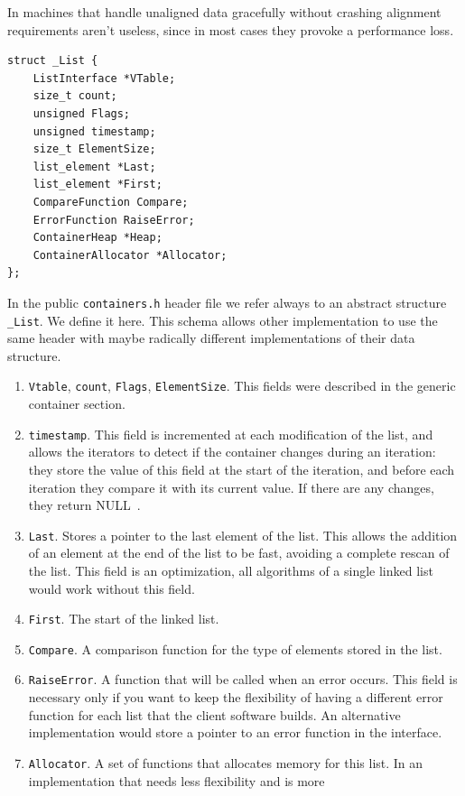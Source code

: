 \documentclass[12pt,a4paper,openany]{memoir} %
\newif\iftth
\newcommand{\Null}{{\iftth \ NULL \else \footnotesize NULL\  \fi}}
\begin{document}
{{In machines that handle unaligned data gracefully without crashing alignment requirements aren't useless, since in most cases they 
provoke a performance loss.
\begin{verbatim}
struct _List {
    ListInterface *VTable;  
    size_t count;           
    unsigned Flags;	
    unsigned timestamp;   
    size_t ElementSize;   
    list_element *Last;   
    list_element *First;  
    CompareFunction Compare; 
    ErrorFunction RaiseError; 
    ContainerHeap *Heap;
    ContainerAllocator *Allocator;
};
\end{verbatim}
In the public \texttt{containers.h} header file we refer always to an abstract structure \texttt{\_List}. We define it here. This schema allows other 
implementation to use the same header with maybe radically different implementations of their data structure.
\begin{enumerate}
\item \texttt{Vtable}, \texttt{count}, \texttt{Flags}, \texttt{ElementSize}. This fields were described in the generic container section.
\item \texttt{timestamp}. This field is incremented at each modification of the list, and allows the iterators to detect if the container changes 
during an iteration: they store the value of this field at the start of the iteration, and before each iteration they compare it with its current 
value. If there are any changes, they return \Null.
\item \texttt{Last}. Stores a pointer to the last element of the list. This allows the addition of an element at the end of the list to be fast, 
avoiding a complete rescan of the list. This field is an optimization, all algorithms of a single linked list would work without this field.
\item \texttt{First}. The start of the linked list.
\item \texttt{Compare}. A comparison function for the type of elements stored in the list.
\item \texttt{RaiseError}. A function that will be called when an error occurs. This field is necessary only if you want to keep the flexibility of 
having a different error function for each list that the client software builds. An alternative implementation would store a pointer to an error 
function in the interface.
\item \texttt{Allocator}. A set of functions that allocates memory for this list. In an implementation that needs less flexibility and is more 

\end{enumerate}}}
\end{document}

